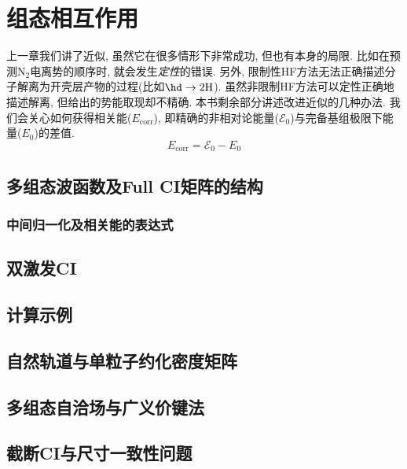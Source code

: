 \chapter{组态相互作用}
上一章我们讲了\hft 近似, 虽然它在很多情形下非常成功, 但也有本身的局限. \hft 比如在预测$\text{N}_2$电离势的顺序时, 就会发生\emph{定性}的错误. 另外, 限制性HF方法无法正确描述分子解离为开壳层产物的过程(比如$\hd\to2\text{H}$). 虽然非限制HF方法可以定性正确地描述解离, 但给出的势能取现却不精确. 本书剩余部分讲述改进\hft 近似的几种办法. 我们会关心如何获得相关能($E_\mathrm{corr}$), 即精确的非相对论能量($\mathscr{E}_0$)与完备基组极限下\hft 能量($E_0$)的差值.
\begin{equation}
E_\mathrm{corr}=\mathscr{E}_0-E_0
\end{equation}
\section{多组态波函数及Full CI矩阵的结构}
\subsection{中间归一化及相关能的表达式}
\section{双激发CI}
\section{计算示例}
\section{自然轨道与单粒子约化密度矩阵}
\section{多组态自洽场与广义价键法}
\section{截断CI与尺寸一致性问题}